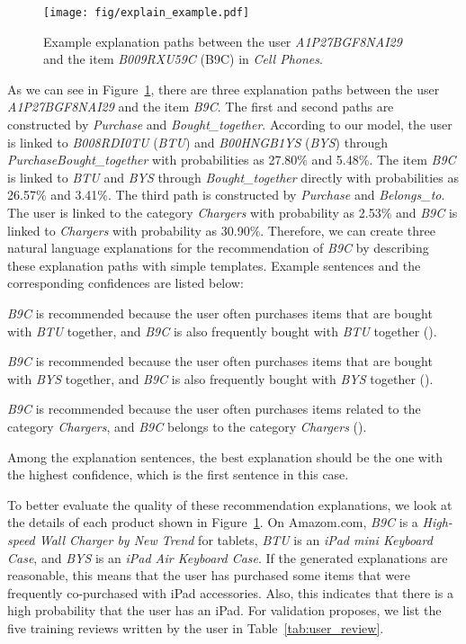 \documentclass[algorithms,article,accept,moreauthors,pdftex,10pt,a4paper]{Definitions/mdpi}
\begin{document}
\begin{figure}[H]
	\texttt{[image: fig/explain\_example.pdf]}
	\caption{Example explanation paths between the user \textit{A1P27BGF8NAI29} and the item \textit{B009RXU59C} (B9C) in \textit{Cell Phones}.}\label{fig:case_study}
\end{figure}

As we can see in Figure~\ref{fig:case_study}, there are three explanation paths between the user \textit{A1P27BGF8NAI29} and the item \textit{B9C}.
The first and second paths are constructed by \textit{Purchase} and \textit{Bought\_together}.
According to our model, the user is linked to \textit{B008RDI0TU} (\textit{BTU}) and \textit{B00HNGB1YS} (\textit{BYS}) through \textit{Purchase}\textit{Bought\_together} with probabilities as 27.80\% and 5.48\%.
The item \textit{B9C} is linked to \textit{BTU} and \textit{BYS} through \textit{Bought\_together} directly with probabilities as 26.57\% and 3.41\%.
The third path is constructed by \textit{Purchase} and \textit{Belongs\_to}.
The user is linked to the category \textit{Chargers} with probability as 2.53\% and \textit{B9C} is linked to \textit{Chargers} with probability as 30.90\%.
Therefore, we can create three natural language explanations for the recommendation of \textit{B9C} by describing these explanation paths with simple templates.
Example sentences and the corresponding confidences are listed below:

 \textit{B9C} is recommended because the user often purchases items that are bought with \textit{BTU} together, and \textit{B9C} is also frequently bought with \textit{BTU} together ().

\vspace{6 pt}  \textit{B9C} is recommended because the user often purchases items that are bought with \textit{BYS} together, and \textit{B9C} is also frequently bought with \textit{BYS} together ().

 \textit{B9C} is recommended because the user often purchases items related to the category \textit{Chargers}, and \textit{B9C} belongs to the category \textit{Chargers} ().

Among the explanation sentences, the best explanation should be the one with the highest confidence, which is the first sentence in this case.



To better evaluate the quality of these recommendation explanations, we look at the details of each product shown in Figure~\ref{fig:case_study}.
On Amazom.com, \textit{B9C} is a \textit{High-speed Wall Charger by New Trend} for tablets, \textit{BTU} is an \textit{iPad mini Keyboard Case}, and \textit{BYS} is an \textit{iPad Air Keyboard Case}.
If the generated explanations are reasonable, this means that the user has purchased some items that were frequently co-purchased with iPad accessories.
Also, this indicates that there is a high probability that the user has an iPad. 
For validation proposes, we list the five training reviews written by the user in Table~\ref{tab:user_review}.
\end{document}
